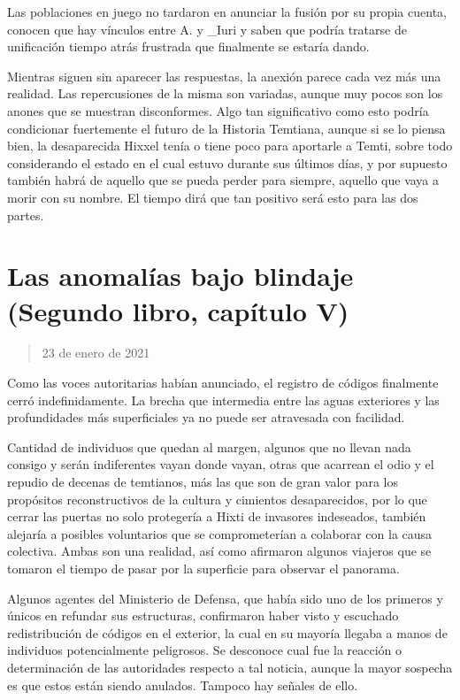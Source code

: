 \documentclass[
  spanish,
]{book}
\begin{document}
Las poblaciones en juego no tardaron en anunciar la fusión por su propia cuenta, conocen que hay vínculos entre A. y \_Iuri y saben que podría tratarse de unificación tiempo atrás frustrada que finalmente se estaría dando.

Mientras siguen sin aparecer las respuestas, la anexión parece cada vez más una realidad. Las repercusiones de la misma son variadas, aunque muy pocos son los anones que se muestran disconformes. Algo tan significativo como esto podría condicionar fuertemente el futuro de la Historia Temtiana, aunque si se lo piensa bien, la desaparecida Hixxel tenía o tiene poco para aportarle a Temti, sobre todo considerando el estado en el cual estuvo durante sus últimos días, y por supuesto también habrá de aquello que se pueda perder para siempre, aquello que vaya a morir con su nombre. El tiempo dirá que tan positivo será esto para las dos partes.

\hypertarget{las-anomaluxedas-bajo-blindaje-segundo-libro-capuxedtulo-v}{%
\section{Las anomalías bajo blindaje (Segundo libro, capítulo V)}\label{las-anomaluxedas-bajo-blindaje-segundo-libro-capuxedtulo-v}}

\begin{quote}
23 de enero de 2021
\end{quote}

Como las voces autoritarias habían anunciado, el registro de códigos finalmente cerró indefinidamente. La brecha que intermedia entre las aguas exteriores y las profundidades más superficiales ya no puede ser atravesada con facilidad.

Cantidad de individuos que quedan al margen, algunos que no llevan nada consigo y serán indiferentes vayan donde vayan, otras que acarrean el odio y el repudio de decenas de temtianos, más las que son de gran valor para los propósitos reconstructivos de la cultura y cimientos desaparecidos, por lo que cerrar las puertas no solo protegería a Hixti de invasores indeseados, también alejaría a posibles voluntarios que se comprometerían a colaborar con la causa colectiva. Ambas son una realidad, así como afirmaron algunos viajeros que se tomaron el tiempo de pasar por la superficie para observar el panorama.

Algunos agentes del Ministerio de Defensa, que había sido uno de los primeros y únicos en refundar sus estructuras, confirmaron haber visto y escuchado redistribución de códigos en el exterior, la cual en su mayoría llegaba a manos de individuos potencialmente peligrosos. Se desconoce cual fue la reacción o determinación de las autoridades respecto a tal noticia, aunque la mayor sospecha es que estos están siendo anulados. Tampoco hay señales de ello.
\end{document}
